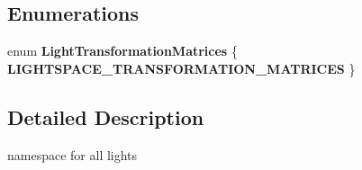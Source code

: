 \subsection*{Enumerations}
\begin{DoxyCompactItemize}
\item 
\mbox{\label{namespace_geometry_engine_1_1_geometry_world_item_1_1_geometry_light_a6b1cd7e70f354c31b5ce908a6772e4ec}} 
enum {\bfseries Light\+Transformation\+Matrices} \{ {\bfseries L\+I\+G\+H\+T\+S\+P\+A\+C\+E\+\_\+\+T\+R\+A\+N\+S\+F\+O\+R\+M\+A\+T\+I\+O\+N\+\_\+\+M\+A\+T\+R\+I\+C\+ES}
 \}
\end{DoxyCompactItemize}


\subsection{Detailed Description}
namespace for all lights 